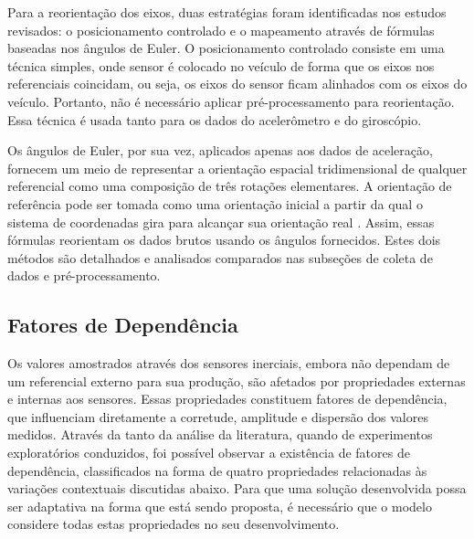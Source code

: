 Para a reorientação dos eixos, duas estratégias foram identificadas nos estudos revisados: o posicionamento controlado e o mapeamento através de fórmulas baseadas nos ângulos de Euler. O posicionamento controlado consiste em uma técnica simples, onde sensor é colocado no veículo de forma que os eixos nos referenciais coincidam, ou seja, os eixos do sensor ficam alinhados com os eixos do veículo. Portanto, não é necessário aplicar pré-processamento para reorientação. Essa técnica é usada tanto para os dados do acelerômetro e do giroscópio. 

Os ângulos de Euler, por sua vez, aplicados apenas aos dados de aceleração, fornecem um meio de representar a orientação espacial tridimensional de qualquer referencial como uma composição de três rotações elementares. A orientação de referência pode ser tomada como uma orientação inicial a partir da qual o sistema de coordenadas gira para alcançar sua orientação real \cite{Singh2017}. Assim, essas fórmulas reorientam os dados brutos usando os ângulos fornecidos. Estes dois métodos são detalhados e analisados comparados nas subseções de coleta de dados e pré-processamento. 

\subsection{Fatores de Dependência}

Os valores amostrados através dos sensores inerciais, embora não dependam de um referencial externo para sua produção, são afetados por propriedades externas e internas aos sensores. Essas propriedades constituem fatores de dependência, que influenciam diretamente a corretude, amplitude e dispersão dos valores medidos. Através da tanto da análise da literatura, quando de experimentos exploratórios conduzidos, foi possível observar a existência de fatores de dependência, classificados na forma de quatro propriedades relacionadas às variações contextuais discutidas abaixo. Para que uma solução desenvolvida possa ser adaptativa na forma que está sendo proposta, é necessário que o modelo considere todas estas propriedades no seu desenvolvimento.


